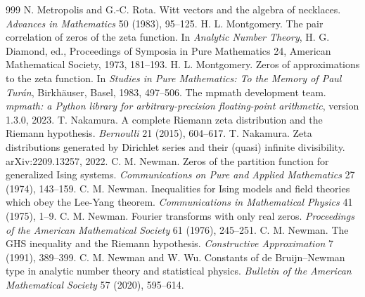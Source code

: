 \begin{thebibliography}{999}
 N. Metropolis and G.-C. Rota. Witt vectors and the algebra of necklaces. \emph{Advances in Mathematics} 50 (1983), 95--125.
 H. L. Montgomery. The pair correlation of zeros of the zeta function. In \emph{Analytic Number Theory}, H. G. Diamond, ed., Proceedings of Symposia in Pure Mathematics 24, American Mathematical Society, 1973, 181--193.
 H. L. Montgomery. Zeros of approximations to the zeta function. In \emph{Studies in Pure Mathematics: To the Memory of Paul Tur\'an}, Birkh\"auser, Basel, 1983, 497--506.
 The mpmath development team. \emph{mpmath: a Python library for arbitrary-precision floating-point arithmetic}, version 1.3.0, 2023.
 T. Nakamura. A complete Riemann zeta distribution and the Riemann hypothesis. \emph{Bernoulli} 21 (2015), 604--617.
 T. Nakamura. Zeta distributions generated by Dirichlet series and their (quasi) infinite divisibility. arXiv:2209.13257, 2022.
 C. M. Newman. Zeros of the partition function for generalized Ising systems. \emph{Communications on Pure and Applied Mathematics} 27 (1974), 143--159.
 C. M. Newman. Inequalities for Ising models and field theories which obey the Lee-Yang theorem. \emph{Communications in Mathematical Physics} 41 (1975), 1--9.
 C. M. Newman. Fourier transforms with only real zeros. \emph{Proceedings of the American Mathematical Society} 61 (1976), 245--251.
 C. M. Newman. The GHS inequality and the Riemann hypothesis. \emph{Constructive Approximation} 7 (1991), 389--399.
 C. M. Newman and W. Wu. Constants of de Bruijn--Newman type in analytic number theory and statistical physics. \emph{Bulletin of the American Mathematical Society} 57 (2020), 595--614.

\end{thebibliography}
